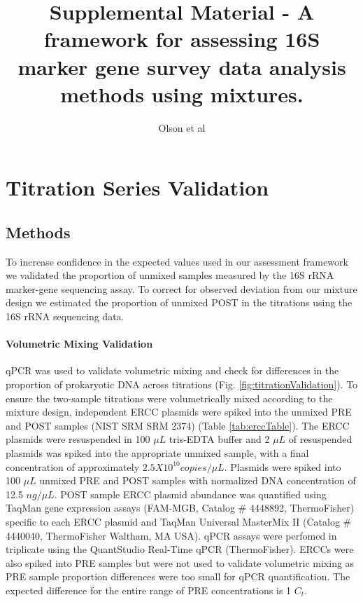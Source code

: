 \documentclass[12pt]{article}
\title{Supplemental Material - A framework for assessing 16S marker gene survey data analysis methods using mixtures.}
\author{Olson et al}
\begin{document}
\maketitle

\section*{Titration Series Validation}
\subsection*{Methods}
To increase confidence in the expected values used in our assessment framework we validated the proportion of unmixed samples measured by the 16S rRNA marker-gene sequencing assay.
To correct for observed deviation from our mixture design we estimated the proportion of unmixed POST in the titrations using the 16S rRNA sequencing data.

\paragraph*{Volumetric Mixing Validation}

qPCR was used to validate volumetric mixing and check for differences in
the proportion of prokaryotic DNA across titrations
(Fig. \ref{fig:titrationValidation}). To ensure the two-sample titrations
were volumetrically mixed according to the mixture design,
independent ERCC plasmids were spiked into the unmixed PRE and
POST samples \cite{baker2005external} (NIST SRM SRM 2374) (Table
\ref{tab:erccTable}). The ERCC plasmids were resuspended in 100
\(\mu L\) tris-EDTA buffer and 2 \(\mu L\) of resuspended plasmids was
spiked into the appropriate unmixed sample, with a final concentration of approximately \(2.5X10^10 copies/\mu L\). Plasmids were spiked into
100 \(\mu L\) unmixed PRE and POST samples with normalized DNA concentration of
12.5 \(ng/\mu L\). POST sample ERCC plasmid abundance was quantified
using TaqMan gene expression assays (FAM-MGB, Catalog \# 4448892,
ThermoFisher) specific to each ERCC plasmid and TaqMan Universal
MasterMix II (Catalog \# 4440040, ThermoFisher Waltham, MA USA).
qPCR assays were perfomed in triplicate using the QuantStudio
Real-Time qPCR (ThermoFisher). ERCCs were also spiked into PRE
samples but were not used to validate volumetric mixing as PRE sample
proportion differences were too small for qPCR quantification.
The expected difference for the entire range of PRE concentrations
is 1 \(C_t\).
\end{document}
